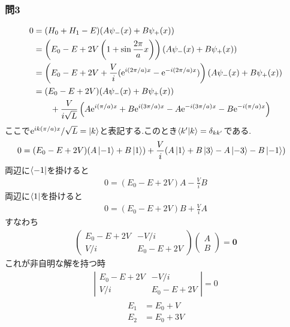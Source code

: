 \documentclass[uplatex,a4j,11pt,dvipdfmx]{jsarticle}
\begin{document}
\subsubsection*{問3}
\begin{align}
  \begin{split}
    0&=(H_0+H_1-E)(A\psi_-(x)+B\psi_+(x))\\
    &=\left(E_0-E+2V\left(1+\sin\frac{2\pi}{a}x\right)\right)(A\psi_-(x)+B\psi_+(x))\\
    &=\left(E_0-E+2V+\frac{V}{i}({\rm e}^{i(2\pi/a)x}-{\rm e}^{-i(2\pi/a)x})\right)(A\psi_-(x)+B\psi_+(x))\\
    &=(E_0-E+2V)(A\psi_-(x)+B\psi_+(x))\\
    &\qquad+\frac{V}{i\sqrt{L}}\left(A{\rm e}^{i(\pi/a)x}+B{\rm e}^{i(3\pi/a)x}-A{\rm e}^{-i(3\pi/a)x}-B{\rm e}^{-i(\pi/a)x}\right)
  \end{split}
\end{align}
ここで${\rm e}^{ik(\pi/a)x}/\sqrt{L}=\ket{k}$と表記する.このとき$\braket{k'|k}=\delta_{kk'}$である.
\begin{align}
  0&=(E_0-E+2V)(A\ket{-1}+B\ket{1})+\frac{V}{i}(A\ket{1}+B\ket{3}-A\ket{-3}-B\ket{-1})
\end{align}
両辺に$\bra{-1}$を掛けると
\begin{align}
  0=(E_0-E+2V)A-\frac{V}{i}B
\end{align}
両辺に$\bra{1}$を掛けると
\begin{align}
  0=(E_0-E+2V)B+\frac{V}{i}A
\end{align}
すなわち
\begin{align}
  \left(
    \begin{array}{cc}
      E_0-E+2V&-V/i\\
      V/i&E_0-E+2V
  \end{array}\right)\left(
    \begin{array}{c}
      A\\B
    \end{array}
  \right)={\bm 0}
\end{align}
これが非自明な解を持つ時
\begin{align}
  \left|
  \begin{array}{cc}
    E_0-E+2V&-V/i\\
    V/i&E_0-E+2V
  \end{array}
  \right|=0
\end{align}
\begin{align}
  \begin{split}
    E_1&=E_0+V\\
    E_2&=E_0+3V
  \end{split}
\end{align}
\end{document}
